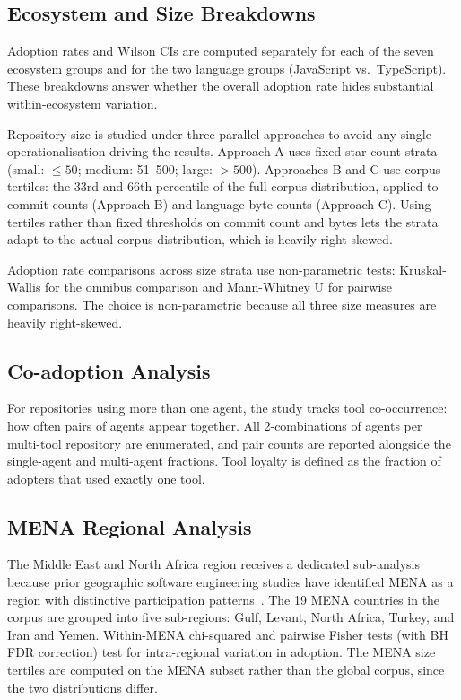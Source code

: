 \subsection{Ecosystem and Size Breakdowns}

Adoption rates and Wilson CIs are computed separately for each of the seven ecosystem groups and for the two language groups (JavaScript vs.\ TypeScript). These breakdowns answer whether the overall adoption rate hides substantial within-ecosystem variation.

Repository size is studied under three parallel approaches to avoid any single operationalisation driving the results. Approach A uses fixed star-count strata (small: $\leq 50$; medium: 51--500; large: $> 500$). Approaches B and C use corpus tertiles: the 33rd and 66th percentile of the full corpus distribution, applied to commit counts (Approach B) and language-byte counts (Approach C). Using tertiles rather than fixed thresholds on commit count and bytes lets the strata adapt to the actual corpus distribution, which is heavily right-skewed.

Adoption rate comparisons across size strata use non-parametric tests: Kruskal-Wallis for the omnibus comparison and Mann-Whitney U for pairwise comparisons. The choice is non-parametric because all three size measures are heavily right-skewed.

\subsection{Co-adoption Analysis}

For repositories using more than one agent, the study tracks tool co-occurrence: how often pairs of agents appear together. All 2-combinations of agents per multi-tool repository are enumerated, and pair counts are reported alongside the single-agent and multi-agent fractions. Tool loyalty is defined as the fraction of adopters that used exactly one tool.

\subsection{MENA Regional Analysis}

The Middle East and North Africa region receives a dedicated sub-analysis because prior geographic software engineering studies have identified MENA as a region with distinctive participation patterns~\cite{wachs2022}. The 19 MENA countries in the corpus are grouped into five sub-regions: Gulf, Levant, North Africa, Turkey, and Iran and Yemen. Within-MENA chi-squared and pairwise Fisher tests (with BH FDR correction) test for intra-regional variation in adoption. The MENA size tertiles are computed on the MENA subset rather than the global corpus, since the two distributions differ.


